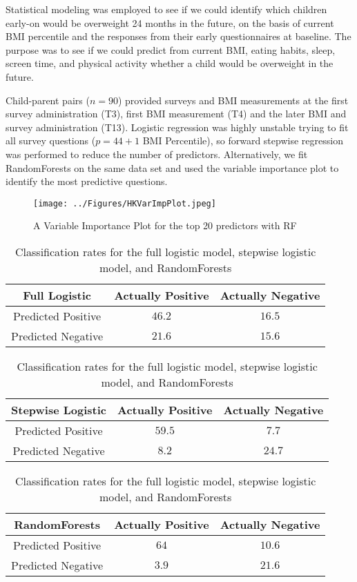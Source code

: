 \documentclass[11pt]{article}
\begin{document}
Statistical modeling was employed to see if we could identify which children early-on would be overweight 24 months in the future, on the basis of current BMI percentile and the responses from their early questionnaires at baseline. The purpose was to see if we could predict from current BMI, eating habits, sleep, screen time, and physical activity whether a child would be overweight in the future.

Child-parent pairs ($n=90$) provided surveys and BMI measurements at the first survey administration (T3), first BMI measurement (T4) and the later BMI and survey administration (T13). Logistic regression was highly unstable trying to fit all survey questions ($p=44+1$ BMI Percentile), so forward stepwise regression was performed to reduce the number of predictors. Alternatively, we fit RandomForests on the same data set and used the variable importance plot to identify the most predictive questions.

\begin{figure}[H] \center
\texttt{[image: ../Figures/HKVarImpPlot.jpeg]} 
\caption{A Variable Importance Plot for the top 20 predictors with RF}
\end{figure}

\begin{table}[H] \center
\caption{Classification rates for the full logistic model, stepwise logistic model, and RandomForests}
\begin{tabular}{|c|c|c|} \hline
\textbf{Full Logistic} & Actually Positive & Actually Negative \\ \hline
Predicted Positive & $46.2$ & $16.5$ \\ \hline
Predicted Negative & $21.6$ & $15.6$ \\ \hline
\end{tabular}

\begin{tabular}{|c|c|c|} \hline
\textbf{Stepwise Logistic} & Actually Positive & Actually Negative \\ \hline
Predicted Positive & $59.5$ & $7.7$ \\ \hline
Predicted Negative & $8.2$ & $24.7$ \\ \hline
\end{tabular}

\begin{tabular}{|c|c|c|} \hline
\textbf{RandomForests} & Actually Positive & Actually Negative \\ \hline
Predicted Positive & $64$ & $10.6$ \\ \hline
Predicted Negative & $3.9$ & $21.6$ \\ \hline
\end{tabular}
\end{table}
\end{document}

